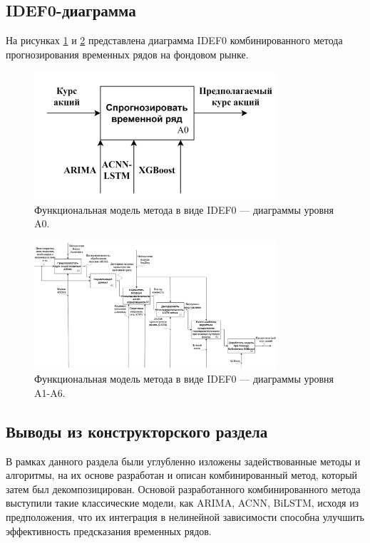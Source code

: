 \newpage

\subsection{IDEF0-диаграмма}

\par На рисунках \ref{fig:idef0} и \ref{fig:idef0a1} представлена диаграмма IDEF0 комбинированного метода прогнозирования временных рядов на фондовом рынке.

\begin{figure}[hbtp]
  \centering
  \includegraphics[width=0.8\textwidth]{img/IDEF0.png}
  \caption{Функциональная модель метода в виде IDEF0 — диаграммы уровня A0.}
  \label{fig:idef0}
\end{figure}


\begin{figure}[hbtp]
  \centering
  \includegraphics[width=0.8\textwidth]{img/IDEF0A1.png}
  \caption{Функциональная модель метода в виде IDEF0 — диаграммы уровня A1-A6.}
  \label{fig:idef0a1}
\end{figure}


\subsection{Выводы из конструкторского раздела}
\par В рамках данного раздела были углубленно изложены задействованные методы и алгоритмы, на их основе разработан и описан комбинированный метод, который затем был декомпозицирован. Основой разработанного комбинированного метода выступили такие классические модели, как ARIMA, ACNN, BiLSTM, исходя из предположения, что их интеграция в нелинейной зависимости способна улучшить эффективность предсказания временных рядов.
\pagebreak 